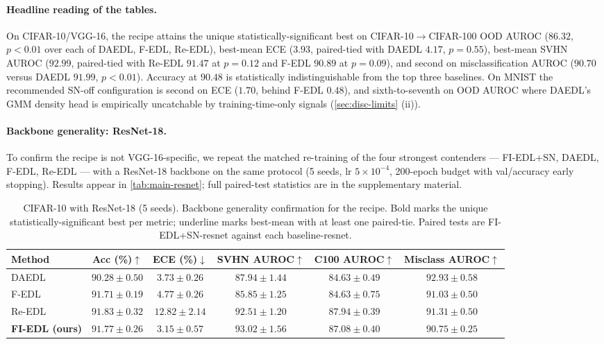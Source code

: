 \documentclass[review,5p,times]{elsarticle}
\begin{document}
\paragraph{Headline reading of the tables.} On CIFAR-10/VGG-16, the
recipe attains the unique statistically-significant best on
CIFAR-10$\to$CIFAR-100 OOD AUROC ($86.32$, $p\!<\!0.01$ over each of
DAEDL, F-EDL, Re-EDL), best-mean ECE ($3.93$, paired-tied with DAEDL
$4.17$, $p\!=\!0.55$), best-mean SVHN AUROC ($92.99$, paired-tied with
Re-EDL $91.47$ at $p\!=\!0.12$ and F-EDL $90.89$ at $p\!=\!0.09$), and
second on misclassification AUROC ($90.70$ versus DAEDL $91.99$,
$p\!<\!0.01$). Accuracy at $90.48$ is statistically indistinguishable
from the top three baselines. On MNIST the recommended SN-off
configuration is second on ECE ($1.70$, behind F-EDL $0.48$), and
sixth-to-seventh on OOD AUROC where DAEDL's GMM density head is
empirically uncatchable by training-time-only signals
(\autoref{sec:disc-limits} (ii)).

\paragraph{Backbone generality: ResNet-18.}
To confirm the recipe is not VGG-16-specific, we repeat the matched
re-training of the four strongest contenders --- FI-EDL+SN, DAEDL,
F-EDL, Re-EDL --- with a ResNet-18 backbone on the same protocol (5
seeds, lr $5\!\times\!10^{-4}$, 200-epoch budget with val/accuracy
early stopping). Results appear in \autoref{tab:main-resnet}; full
paired-test statistics are in the supplementary material.

\begin{table}[t]
  \centering
  \caption{CIFAR-10 with ResNet-18 (5 seeds). Backbone generality
    confirmation for the recipe. Bold marks the unique
    statistically-significant best per metric; underline marks
    best-mean with at least one paired-tie. Paired tests are
    FI-EDL+SN-resnet against each baseline-resnet.}
  \label{tab:main-resnet}
  \small
  \begin{tabular}{lccccc}
    \toprule
    Method & Acc (\%)$\uparrow$ & ECE (\%)$\downarrow$ & SVHN AUROC$\uparrow$
      & C100 AUROC$\uparrow$ & Misclass AUROC$\uparrow$ \\
    \midrule
    DAEDL  & $90.28 \pm 0.50$ & $3.73 \pm 0.26$ & $87.94 \pm 1.44$
      & $84.63 \pm 0.49$ & $\mathbf{92.93 \pm 0.58}$ \\
    F-EDL  & $91.71 \pm 0.19$ & $4.77 \pm 0.26$ & $85.85 \pm 1.25$
      & $84.63 \pm 0.75$ & $91.03 \pm 0.50$ \\
    Re-EDL & $91.83 \pm 0.32$ & $12.82 \pm 2.14$ & $92.51 \pm 1.20$
      & $\mathbf{87.94 \pm 0.39}$ & $91.31 \pm 0.50$ \\
    \textbf{FI-EDL (ours)} & $91.77 \pm 0.26$ & $\mathbf{3.15 \pm 0.57}$
      & \underline{$93.02 \pm 1.56$} & $87.08 \pm 0.40$ & $90.75 \pm 0.25$ \\
    \bottomrule
  \end{tabular}
\end{table}
\end{document}
